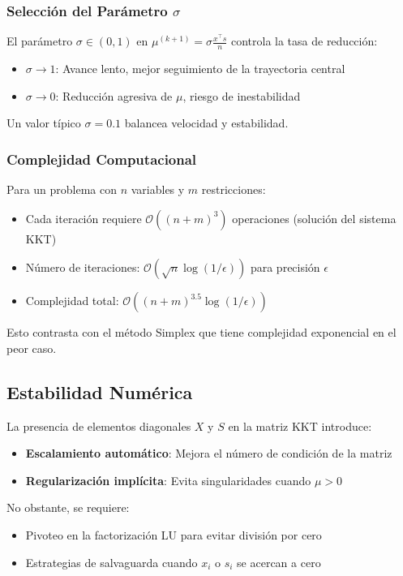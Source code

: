 \documentclass{article}
\begin{document}
\subsubsection{Selección del Parámetro $\sigma$}
El parámetro $\sigma \in (0,1)$ en $\mu^{(k+1)} = \sigma \frac{x^\top s}{n}$ controla la tasa de reducción:
\begin{itemize}
\item $\sigma \to 1$: Avance lento, mejor seguimiento de la trayectoria central
\item $\sigma \to 0$: Reducción agresiva de $\mu$, riesgo de inestabilidad
\end{itemize}
Un valor típico $\sigma = 0.1$ balancea velocidad y estabilidad.

\subsubsection{Complejidad Computacional}
Para un problema con $n$ variables y $m$ restricciones:
\begin{itemize}
\item Cada iteración requiere $\mathcal{O}((n+m)^3)$ operaciones (solución del sistema KKT)
\item Número de iteraciones: $\mathcal{O}(\sqrt{n} \log(1/\epsilon))$ para precisión $\epsilon$
\item Complejidad total: $\mathcal{O}((n+m)^{3.5} \log(1/\epsilon))$ 
\end{itemize}
Esto contrasta con el método Simplex que tiene complejidad exponencial en el peor caso.

\subsection{Estabilidad Numérica}
La presencia de elementos diagonales $X$ y $S$ en la matriz KKT introduce:
\begin{itemize}
\item \textbf{Escalamiento automático}: Mejora el número de condición de la matriz
\item \textbf{Regularización implícita}: Evita singularidades cuando $\mu > 0$
\end{itemize}
No obstante, se requiere:
\begin{itemize}
\item Pivoteo en la factorización LU para evitar división por cero
\item Estrategias de salvaguarda cuando $x_i$ o $s_i$ se acercan a cero
\end{itemize}
\end{document}
